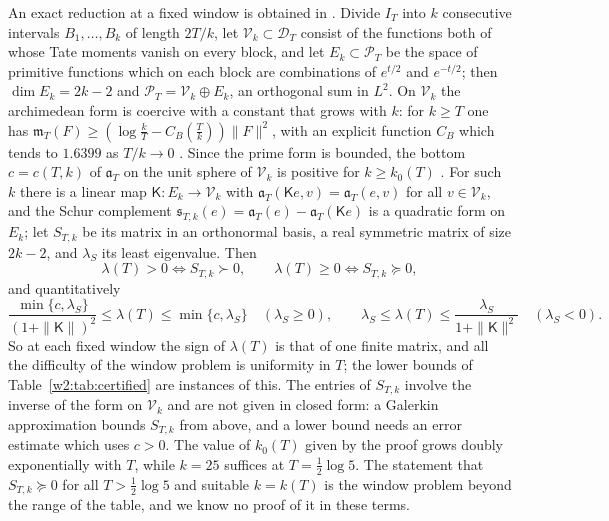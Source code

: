 \documentclass[11pt]{amsart}
\theoremstyle{definition}
\theoremstyle{remark}
\numberwithin{equation}{section}
\newcommand{\IT}{I_T}                                  %
\newcommand{\PT}{\mathcal{P}_T}                        %
\newcommand{\DT}{\mathcal{D}_T}                        %
\newcommand{\mT}{\mathfrak{m}_T}                       %
\newcommand{\aT}{\mathfrak{a}_T}                       %
\newcommand{\lam}{\lambda(T)}                          %
\begin{document}
An exact reduction at a fixed window is obtained in \cite[\S10]{P46}. Divide $\IT$ into $k$ consecutive intervals
$B_1,\dots,B_k$ of length $2T/k$, let $\mathcal V_k\subset\DT$ consist of the functions both of whose Tate moments
vanish on every block, and let $E_k\subset\PT$ be the space of primitive functions which on each block are
combinations of $e^{t/2}$ and $e^{-t/2}$; then $\dim E_k=2k-2$ and $\PT=\mathcal V_k\oplus E_k$, an orthogonal sum in
$L^2$. On $\mathcal V_k$ the archimedean form is coercive with a constant that grows with $k$:
for $k\ge T$ one has $\mT(F)\ge(\log\frac kT-C_B(\frac Tk))\|F\|^2$, with an explicit function $C_B$ which tends to
$1.6399$ as $T/k\to0$ \cite[Theorem~10.11]{P46}. Since
the prime form is bounded, the bottom $c=c(T,k)$ of $\aT$ on the unit sphere of $\mathcal V_k$ is positive for
$k\ge k_0(T)$ \cite[Corollary~10.13]{P46}. For such $k$ there is a linear map $\mathsf K\colon E_k\to\mathcal V_k$ with
$\aT(\mathsf Ke,v)=\aT(e,v)$ for all $v\in\mathcal V_k$, and the Schur complement
$\mathfrak s_{T,k}(e)=\aT(e)-\aT(\mathsf Ke)$ is a quadratic form on $E_k$; let $S_{T,k}$ be its matrix in an
orthonormal basis, a real symmetric matrix of size $2k-2$, and $\lambda_S$ its least eigenvalue. Then
\cite[Theorem~10.14]{P46}
\begin{equation}\label{w2:eq:schurred}
\lam>0\iff S_{T,k}\succ0,\qquad \lam\ge0\iff S_{T,k}\succeq0,
\end{equation}
and quantitatively
\[
\frac{\min\{c,\lambda_S\}}{(1+\|\mathsf K\|)^2}\le\lam\le\min\{c,\lambda_S\}\quad(\lambda_S\ge0),\qquad
\lambda_S\le\lam\le\frac{\lambda_S}{1+\|\mathsf K\|^2}\quad(\lambda_S<0).
\]
So at each fixed window the sign of $\lam$ is that of one finite matrix, and all the difficulty of the window problem
is uniformity in $T$; the lower bounds of Table~\ref{w2:tab:certified} are instances of this. The entries of $S_{T,k}$
involve the inverse of the form on $\mathcal V_k$ and are not given in closed form: a Galerkin approximation bounds
$S_{T,k}$ from above, and a lower bound needs an error estimate which uses $c>0$. The value of $k_0(T)$ given by the
proof grows doubly exponentially with $T$, while $k=25$ suffices at $T=\frac12\log5$. The statement that
$S_{T,k}\succeq0$ for all $T>\frac12\log5$ and suitable $k=k(T)$ is the window problem beyond the range of the table,
and we know no proof of it in these terms.
\end{document}

